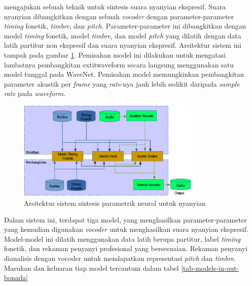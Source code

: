 \citet{bonada2017singing} mengajukan sebuah teknik untuk sintesis suara nyanyian ekspresif. Suara nyanyian dibangkitkan dengan sebuah \textit{vocoder} dengan parameter-parameter \textit{timing} fonetik, \textit{timbre}, dan \textit{pitch}. Parameter-parameter ini dibangkitkan dengan model \textit{timing} fonetik, model \textit{timbre}, dan model \textit{pitch} yang dilatih dengan data latih partitur non ekspresif dan suara nyanyian ekspresif. Arsitektur sistem ini tampak pada gambar \ref{fig-system-overview-bonada}. Pemisahan model ini dilakukan untuk mengatasi lambatnya pembangkitan 	extit{waveform} secara langsung menggunakan satu model tunggal pada WaveNet\parencite{Oord2016WaveNetAG}. Pemisahan model memungkinkan pembangkitan parameter akustik per \textit{frame} yang \textit{rate}-nya jauh lebih sedikit daripada \textit{sample rate} pada \textit{waveform}.

\begin{figure}[h]
    \centering
    \includegraphics[width=0.8\textwidth]{resources/system-overview-bonada.eps}
    \caption{Arsitektur sistem sintesis parametrik neural untuk nyanyian \parencite{bonada2017singing}}\label{fig-system-overview-bonada}
\end{figure}

Dalam sistem ini, terdapat tiga model, yang menghasilkan parameter-parameter yang kemudian digunakan \textit{vocoder} untuk menghasilkan suara nyanyian ekspresif. Model-model ini dilatih menggunakan data latih berupa partitur, label \textit{timing} fonetik, dan rekaman penyanyi profesional yang bersesuaian. Rekaman penyanyi dianalisis dengan vocoder untuk mendapatkan representasi \textit{pitch} dan \textit{timbre}. Masukan dan keluaran tiap model tercantum dalam tabel \ref{tab-models-in-out-bonada}

